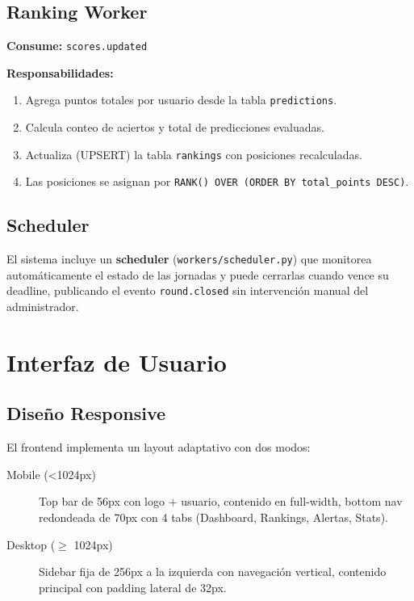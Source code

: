 \documentclass[12pt,a4paper]{article}
\newcommand{\code}[1]{\texttt{\small\color{navy}#1}}
\newcommand{\event}[1]{\texttt{\small\color{accent}#1}}
\begin{document}
\subsection{Ranking Worker}

\textbf{Consume:} \event{scores.updated}

\textbf{Responsabilidades:}
\begin{enumerate}
  \item Agrega puntos totales por usuario desde la tabla \code{predictions}.
  \item Calcula conteo de aciertos y total de predicciones evaluadas.
  \item Actualiza (UPSERT) la tabla \code{rankings} con posiciones recalculadas.
  \item Las posiciones se asignan por \code{RANK() OVER (ORDER BY total\_points DESC)}.
\end{enumerate}

\subsection{Scheduler}

El sistema incluye un \textbf{scheduler} (\code{workers/scheduler.py}) que monitorea
automáticamente el estado de las jornadas y puede cerrarlas cuando vence su deadline,
publicando el evento \event{round.closed} sin intervención manual del administrador.

\section{Interfaz de Usuario}

\subsection{Diseño Responsive}

El frontend implementa un layout adaptativo con dos modos:

\begin{description}
  \item[Mobile (\textless 1024px)] Top bar de 56px con logo + usuario, contenido en full-width,
        bottom nav redondeada de 70px con 4 tabs (Dashboard, Rankings, Alertas, Stats).
  \item[Desktop ($\geq$ 1024px)] Sidebar fija de 256px a la izquierda con navegación vertical,
        contenido principal con padding lateral de 32px.
\end{description}
\end{document}
